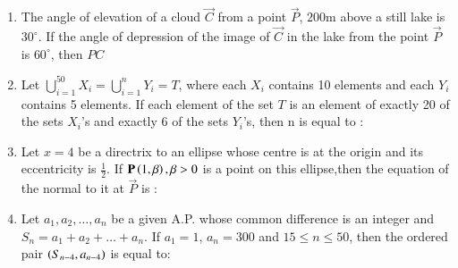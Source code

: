 \documentclass[journal]{IEEEtran}
\begin{document}
\begin{enumerate}[start=16]
\item The angle of elevation of a cloud $\vec{C}$ from a point $\vec{P}$, $200 $m above a still lake is $30^{\circ}$. If the angle of depression of the image of $\vec{C}$ in the lake from the point $\vec{P}$ is $60^{\circ}$, then $PC$ 
\begin{enumerate}
\end{enumerate}

\item Let $\bigcup_{i=1}^{50} X_i = \bigcup_{i=1}^{n} Y_i = T$, where each ${X_i}$ contains 10 elements and each ${Y_i}$ contains 5 elements. If each element of the set $T$ is an element of exactly 20 of the sets ${X_i}$'s and exactly 6 of the sets ${Y_i}$'s, then  n is equal to :


\begin{enumerate}
\end{enumerate}

\item Let $x=4$ be a directrix to an ellipse whose centre is at the origin and its eccentricity is $\frac{1}{2}$. If $\mathbf{P}\left(1,\beta\right),\beta>0$ is a point on this ellipse,then the equation of the normal to it at $\vec{P}$ is :
\begin{enumerate}
\end{enumerate}

\item Let $a_1, a_2, \ldots, a_n$ be a given A.P. whose common difference is an integer and $S_n = a_1 + a_2 + \ldots + a_n$. If $a_1 = 1$, $a_n = 300$ and $15 \leq n \leq 50$, then the ordered pair  $\left(S_{n-4}, a_{n-4}\right)$ is equal to:


\end{enumerate}
\end{document}
